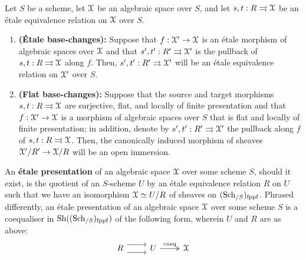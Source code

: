             \begin{proposition} \label{prop: base_changing_etale_and_flat_equivalence_relations_in_algebraic_spaces}
                Let $S$ be a scheme, let $\mathcal{X}$ be an algebraic space over $S$, and let $s, t: R \rightrightarrows \mathcal{X}$ be an \'etale equivalence relation on $\mathcal{X}$ over $S$.
                    \begin{enumerate}
                        \item \textbf{(\'Etale base-changes):} Suppose that $f: \mathcal{X}' \to \mathcal{X}$ is an \'etale morphism of algebraic spaces over $\mathcal{X}$ and that $s', t': R' \rightrightarrows \mathcal{X}'$ is the pullback of $s, t: R \rightrightarrows \mathcal{X}$ along $f$. Then, $s', t': R' \rightrightarrows \mathcal{X}'$ will be an \'etale equivalence relation on $\mathcal{X}'$ over $S$.
                        \item \textbf{(Flat base-changes):} Suppose that the source and target morphisms $s, t: R \rightrightarrows \mathcal{X}$ are surjective, flat, and locally of finite presentation and that $f: \mathcal{X}' \to \mathcal{X}$ is a morphism of algebraic spaces over $S$ that is flat and locally of finite presentation; in addition, denote by $s', t': R' \rightrightarrows \mathcal{X}'$ the pullback along $f$ of $s, t: R \rightrightarrows \mathcal{X}$. Then, the canonically induced morphism of sheaves $\mathcal{X}'/R' \to \mathcal{X}/R$ will be an open immersion. 
                    \end{enumerate}
            \end{proposition}
            \begin{definition} \label{def: etale_presentations_of_algebraic_spaces}
                An \textbf{\'etale presentation} of an algebraic space $\mathcal{X}$ over some scheme $S$, should it exist, is the quotient of an $S$-scheme $U$ by an \'etale equivalence relation $R$ on $U$ such that we have an isomorphism $\mathcal{X} \simeq U/R$ of sheaves on $(\mathrm{Sch}_{/S})_{\mathrm{fppf}}$. Phrased differently, an \'etale presentation of an algebraic space $\mathcal{X}$ over some scheme $S$ is a coequaliser in $\mathrm{Sh}((\mathrm{Sch}_{/S})_{\mathrm{fppf}})$ of the following form, wherein $U$ and $R$ are as above:
                    $$
                        \begin{tikzcd}
                        	R & U & \calX
                        	\arrow[shift right=2, from=1-1, to=1-2]
                        	\arrow[shift left=2, from=1-1, to=1-2]
                        	\arrow["\coeq", two heads, from=1-2, to=1-3]
                        \end{tikzcd}
                    $$
            \end{definition}
